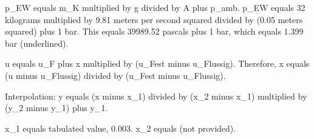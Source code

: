 p_EW equals m_K multiplied by g divided by A plus p_amb.  
p_EW equals 32 kilograms multiplied by 9.81 meters per second squared divided by (0.05 meters squared) plus 1 bar.  
This equals 39989.52 pascals plus 1 bar, which equals 1.399 bar (underlined).  

u equals u_F plus x multiplied by (u_Fest minus u_Flussig).  
Therefore, x equals (u minus u_Flussig) divided by (u_Fest minus u_Flussig).  

Interpolation:  
y equals (x minus x_1) divided by (x_2 minus x_1) multiplied by (y_2 minus y_1) plus y_1.  

x_1 equals tabulated value, 0.003.  
x_2 equals (not provided).